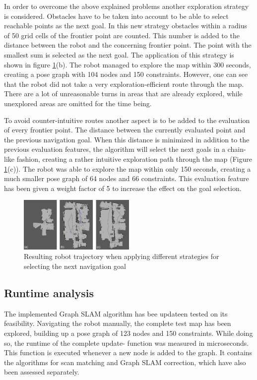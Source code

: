 \documentclass{ba-kecs}
\begin{document}
In order to overcome the above explained problems another exploration strategy is considered. Obstacles have to be taken into account to be able to select reachable points as the next goal. In this new strategy obstacles within a radius of 50 grid cells of the frontier point are counted. This number is added to the distance between the robot and the concerning frontier point. The point with the smallest sum is selected as the next goal. The application of this strategy is shown in figure \ref{fig:navigation_comparison}(b). The robot managed to explore the map within 300 seconds, creating a pose graph with 104 nodes and 150 constraints. However, one can see that the robot did not take a very exploration-efficient route through the map. There are a lot of unreasonable turns in areas that are already explored, while unexplored areas are omitted for the time being.

To avoid counter-intuitive routes another aspect is to be added to the evaluation of every frontier point. The distance between the currently evaluated point and the previous navigation goal. When this distance is minimized in addition to the previous evaluation features, the algorithm will select the next goals in a chain-like fashion, creating a rather intuitive exploration path through the map (Figure \ref{fig:navigation_comparison}(c)). The robot was able to explore the map within only 150 seconds, creating a much smaller pose graph of 64 nodes and 66 constraints. This evaluation feature has been given a weight factor of 5 to increase the effect on the goal selection.

\begin{figure}[htbp]
	\centering
		\includegraphics[width=0.50\textwidth]{figures/Navigation_comparison.jpg}
	\caption{Resulting robot trajectory when applying different strategies for selecting the next navigation goal}
	\label{fig:navigation_comparison}
\end{figure}

\subsection{Runtime analysis}
The implemented Graph SLAM algorithm has bee updateen tested on its feasibility. Navigating the robot manually, the complete test map has been explored, building up a pose graph of 123 nodes and 150 constraints. While doing so, the runtime of the complete update- function was measured in microseconds. This function is executed whenever a new node is added to the graph. It contains the algorithms for scan matching and Graph SLAM correction, which have also been assessed separately.
\end{document}
